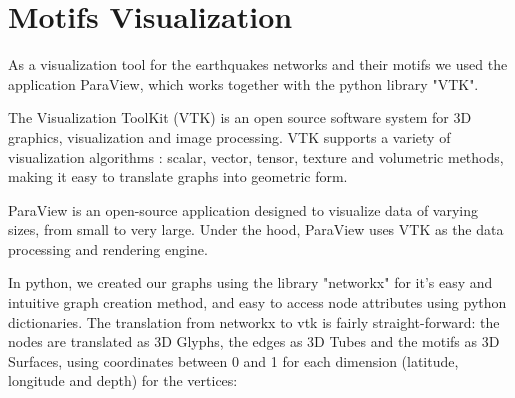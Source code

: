 

\clearpage
\section{Motifs Visualization}
As a visualization tool for the earthquakes networks and their motifs we used the application ParaView, which works together with the python library "VTK".\par
The Visualization ToolKit (VTK) is an open source software system for 3D graphics, visualization and image processing. VTK supports a variety of visualization algorithms : scalar, vector, tensor, texture and volumetric methods, making it easy to translate graphs into geometric form.\par
ParaView \cite{paraview} is an open-source application designed to visualize data of varying sizes, from small to very large. Under the hood, ParaView uses VTK as the data processing and rendering engine.\par 
In python, we created our graphs using the library "networkx" for it's easy and intuitive graph creation method, and easy to access node attributes using python dictionaries. The translation from networkx to vtk is fairly straight-forward: the nodes are translated as 3D Glyphs, the edges as 3D Tubes and the motifs as 3D Surfaces, using coordinates between 0 and 1 for each dimension (latitude, longitude and depth) for the vertices:
